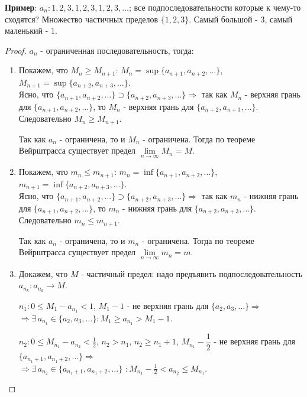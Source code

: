 \documentclass[12pt]{article}
\theoremstyle{definition}
\begin{document}
\textbf{Пример}: $a_n \colon 1, 2, 3, 1, 2, 3, 1, 2, 3, \dotsc$; все подпоследовательности которые к чему-то сходятся? Множество частичных пределов $\{1,2,3\}$. Самый большой - $3$, самый маленький - $1$.

\begin{proof}
$a_n$ - ограниченная последовательность, тогда:

\begin{enumerate}[label={(\arabic*)}]
	\item Покажем, что $M_n \geq M_{n+1}$: $M_n = \sup\{a_{n+1}, a_{n+2}, \dotsc \}$, $M_{n+1} = \sup\{a_{n+2}, a_{n+3}, \dotsc \}$.\\ 
	Ясно, что $\{a_{n+1}, a_{n+2}, \dotsc \} \supset \{a_{n+2}, a_{n+3}, \dotsc \} \Rightarrow$ так как $M_n$ - верхняя грань для $\{a_{n+1}, a_{n+2}, \dotsc \}$, то $M_n$ - верхняя грань для $\{a_{n+2}, a_{n+3}, \dotsc \}$. Следовательно $M_{n} \geq M_{n+1}$.
	
	Так как $a_n$ - ограничена, то и $M_n$ - ограничена. Тогда по теореме Вейрштрасса существует предел $\lim\limits_{n\rightarrow \infty}M_n = M$.
	
	\item Покажем, что $m_n \leq m_{n+1}$: $m_n = \inf\{a_{n+1}, a_{n+2}, \dotsc \}$, $m_{n+1} = \inf\{a_{n+2}, a_{n+3}, \dotsc \}$.\\
	Ясно, что $\{a_{n+1}, a_{n+2}, \dotsc \} \supset \{a_{n+2}, a_{n+3}, \dotsc \} \Rightarrow$ так как $m_n$ - нижняя грань для $\{a_{n+1}, a_{n+2}, \dotsc \}$, то $m_n$ - нижняя грань для $\{a_{n+2}, a_{n+3}, \dotsc \}$. Следовательно $m_{n} \leq m_{n+1}$.
	
	Так как $a_n$ - ограничена, то и $m_n$ - ограничена. Тогда по теореме Вейрштрасса существует предел $\lim\limits_{n\rightarrow \infty}m_n = m$.
	
	\item Докажем, что $M$ - частичный предел: надо предъявить подпоследовательность $a_{n_k} \colon a_{n_k} \rightarrow M$.
	
	$n_1 \colon 0 \leq M_1 - a_{n_1} < 1$, $M_1 - 1$ - не верхняя грань для  $\{a_2, a_3, \dotsc \} \Rightarrow$ \\
	$\Rightarrow \exists \, a_{n_1} \in \{a_2, a_3, \dotsc \} \colon M_1 \geq a_{n_1} > M_1 -1$.
	
	$n_2 \colon 0 \leq M_{n_1}\! - a_{n_2} < \frac{1}{2}$, $n_2 > n_1$, $n_2 \geq n_1 + 1$, $M_{n_1}\! - \dfrac{1}{2}$ - не верхняя грань для $\{a_{n_1 + 1}, a_{n_1 + 2}, \dotsc \} \Rightarrow$\\ 
	$\Rightarrow \exists \, a_{n_2} \in \{a_{n_1 + 1}, a_{n_1 + 2}, \dotsc \}$  $\colon M_{n_1}\! - \frac{1}{2} < a_{n_2} \leq M_{n_1}$.
	

\end{enumerate}
\end{proof}
\end{document}
